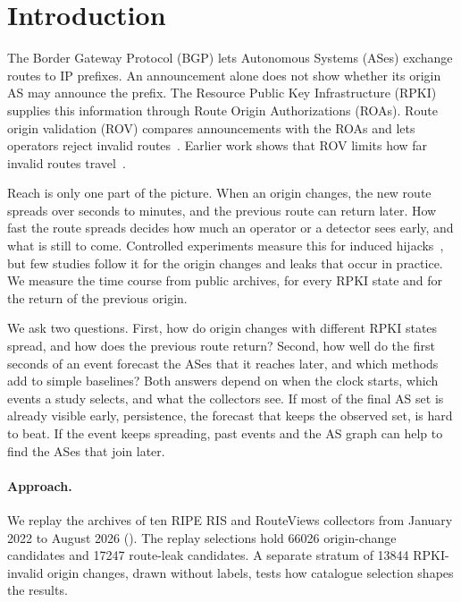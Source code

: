 \section{Introduction}\label{sec:intro}

The Border Gateway Protocol (BGP) lets Autonomous Systems (ASes) exchange routes to IP prefixes.
An announcement alone does not show whether its origin AS may announce the prefix.
The Resource Public Key Infrastructure (RPKI) supplies this information through Route Origin Authorizations (ROAs).
Route origin validation (ROV) compares announcements with the ROAs and lets operators reject invalid routes~\cite{rfc6811}.
Earlier work shows that ROV limits how far invalid routes travel~\cite{testart2020filter,li2023rovista}.

Reach is only one part of the picture.
When an origin changes, the new route spreads over seconds to minutes, and the previous route can return later.
How fast the route spreads decides how much an operator or a detector sees early, and what is still to come.
Controlled experiments measure this for induced hijacks~\cite{sermpezis2018artemis}, but few studies follow it for the origin changes and leaks that occur in practice.
We measure the time course from public archives, for every RPKI state and for the return of the previous origin.

We ask two questions.
First, how do origin changes with different RPKI states spread, and how does the previous route return?
Second, how well do the first seconds of an event forecast the ASes that it reaches later, and which methods add to simple baselines?
Both answers depend on when the clock starts, which events a study selects, and what the collectors see.
If most of the final AS set is already visible early, persistence, the forecast that keeps the observed set, is hard to beat.
If the event keeps spreading, past events and the AS graph can help to find the ASes that join later.

\paragraph{Approach.}
We replay the archives of ten RIPE RIS and RouteViews collectors from January 2022 to August 2026 ().
The replay selections hold \num{66026} origin-change candidates and \num{17247} route-leak candidates.
A separate stratum of \num{13844} RPKI-invalid origin changes, drawn without labels, tests how catalogue selection shapes the results.

